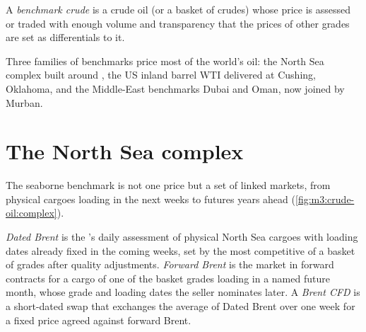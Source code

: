 \begin{definition}\label{def:m3:crude-oil:benchmark}
A \emph{benchmark crude} is a crude oil (or a basket of
crudes) whose price is assessed or traded with enough volume and transparency that
the prices of other grades are set as differentials to it.
\end{definition}

Three families of benchmarks price most of the world's oil: the North Sea complex
built around , the US inland barrel WTI delivered at Cushing,
Oklahoma, and the Middle-East benchmarks Dubai and Oman, now joined by Murban.

\section{The North Sea complex}

The seaborne benchmark is not one price but a set of linked markets, from
physical cargoes loading in the next weeks to futures years ahead
(\cref{fig:m3:crude-oil:complex}).

\begin{definition}\label{def:m3:crude-oil:brent}
\emph{Dated Brent} is the 's daily
assessment of physical North Sea cargoes with loading dates already fixed in the
coming weeks, set by the most competitive of a basket of grades after quality
adjustments. \emph{Forward Brent} is the market in forward
contracts for a cargo of one of the basket grades loading in a named future month,
whose grade and loading dates the seller nominates later. A \emph{Brent
CFD} is a short-dated swap that exchanges the average of Dated Brent
over one week for a fixed price agreed against forward Brent.
\end{definition}

